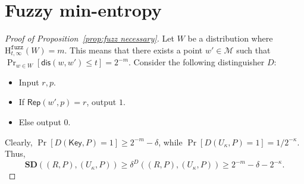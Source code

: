 \documentclass[11pt]{article}
\newcommand{\corref}[1]{\mbox{Corollary~\ref{#1}}}
\newcommand{\lemref}[1]{\mbox{Lemma~\ref{#1}}}
\newcommand{\propref}[1]{\mbox{Proposition~\ref{#1}}}
\newcommand{\class}[1]{{\ensuremath{\mathsf{#1}}}}
\newcommand{\Key}{\ensuremath{\class{Key}}\xspace}
\newcommand{\rep}{\ensuremath{\class{Rep}}\xspace}
\newcommand{\sketch}{\ensuremath{\class{SS}}\xspace}
\newcommand{\rec}{\ensuremath{\class{Rec}}\xspace}
\newcommand{\dis}{\ensuremath{\mathsf{dis}}}
\newcommand{\Hfuzz}{\mathrm{H}^{\mathtt{fuzz}}_{t,\infty}}
\newcommand{\sd}{\ensuremath{\mathbf{SD}}}
\newtheorem{lemma}[theorem]{Lemma}
\newtheorem{corollary}[theorem]{Corollary}
\begin{document}


%
\section{Fuzzy min-entropy}
\label{sec:proof fuzz necessary}
\begin{proof}[Proof of \propref{prop:fuzz necessary}]
Let $W$ be a distribution where $\Hfuzz(W) = m$.  This means that there exists a point $w' \in \mathcal{M}$ such that $\Pr_{w\in W}[\dis (w, w')\leq t] = 2^{-m}$.  Consider the following distinguisher $D$:
\begin{itemize}
\item Input $r, p$.
\item If $\rep(w', p) = r$, output $1$.
\item Else output $0$.
\end{itemize}
Clearly, $\Pr[D(\Key, P) = 1]\geq 2^{-m} - \delta$, while $\Pr[D(U_\kappa, P)=1 ]= 1/2^{-\kappa}$.  Thus,
\[
\sd((R, P), (U_\kappa, P)) \ge \delta^D((R, P), (U_\kappa, P))\geq 2^{-m} -\delta -2^{-\kappa}.
\]
\end{proof}
\end{document}
